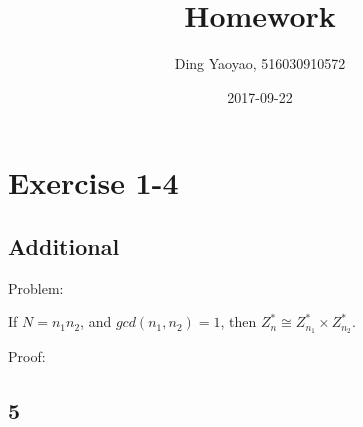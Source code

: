 \documentclass{article}
\title{Homework}
\date{2017-09-22}
\author{Ding Yaoyao, 516030910572}
\begin{document}
	\maketitle

	\section*{Exercise 1-4}
		\subsection*{Additional}
		 Problem: 
		 
		 If $N = n_1 n_2$, and $gcd(n_1, n_2) = 1$, then $Z_n^{*} \cong Z_{n_1}^{*}\times Z_{n_2}^{*}$.

		 Proof:

				
		\subsection*{5}
\end{document}

